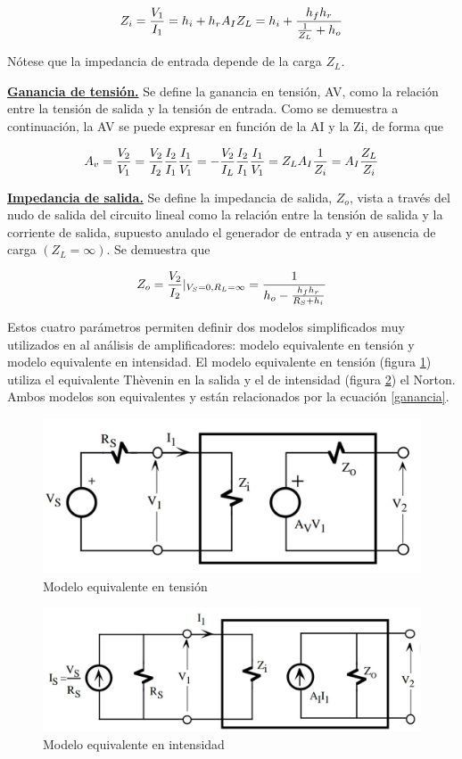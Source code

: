 \documentclass[10pt, a4paper]{article}
\begin{document}
    $$Z_i = {V_1 \over I_1} = h_i + h_rA_IZ_L = h_i + \frac{h_fh_r}{{1 \over Z_L} + h_o}$$

    Nótese que la impedancia de entrada depende de la carga $Z_L$.

    \underline{\bf Ganancia de tensión.}  Se define la ganancia en tensión, AV, como la relación entre la tensión de salida y la tensión de entrada. Como se demuestra a continuación, la AV se puede expresar en función de la AI y la Zi, de forma que

    \begin{equation}
        A_v = {V_2 \over V_1} = {V_2 \over I_2}{I_2 \over I_1}{I_1 \over V_1} = -{V_2 \over I_L}{I_2 \over I_1}{I_1 \over V_1} = Z_LA_I{1 \over Z_i} = A_I{Z_L \over Z_i}
        \label{ganancia}
    \end{equation}

    \underline{\bf Impedancia de salida.} Se define la impedancia de salida, $Z_o$, vista a través del nudo de salida del circuito lineal como la relación entre la tensión de salida y la corriente de salida, supuesto anulado el generador de entrada y en ausencia de carga $(Z_L = \infty)$. Se demuestra que

    $$Z_o = {V_2 \over I_2}|_{V_S = 0, R_L = \infty} = \frac{1}{h_o - {h_fh_r \over R_S + h_i}}$$

    Estos cuatro parámetros permiten definir dos modelos simplificados muy utilizados en al análisis de amplificadores: modelo equivalente en tensión y modelo equivalente en intensidad. El modelo equivalente en tensión (figura \ref{fig:mod-ten}) utiliza el equivalente Thèvenin en la salida y el de intensidad (figura \ref{fig:mod-int}) el Norton. Ambos modelos son equivalentes y están relacionados por la ecuación \ref{ganancia}.

    \begin{figure}[h!]
        \centering
        \includegraphics[height=4cm\textwidth]{mod-ten.jpg}
        \caption{Modelo equivalente en tensión}
        \label{fig:mod-ten}
    \end{figure}

    \begin{figure}[h!]
        \centering
        \includegraphics[height=4cm\textwidth]{mod-int.jpg}
        \caption{Modelo equivalente en intensidad}
        \label{fig:mod-int}
    \end{figure}
\end{document}
